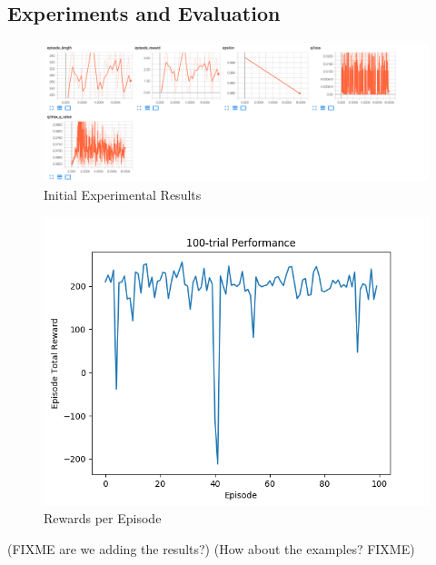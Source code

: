 \subsection{Experiments and Evaluation}

\begin{figure}%
\centering
\includegraphics[width=0.8\columnwidth]{figures/tensorboard.png}%
\caption{Initial Experimental Results}%
\label{fig:datastats}%
\end{figure}



\begin{figure}%
\centering
\includegraphics[width=0.6\columnwidth]{figures/evaluate_100.png}%
\caption{Rewards per Episode}%
\label{fig:datastats}%
\end{figure}

(FIXME are we adding the results?)
(How about the examples? FIXME)

